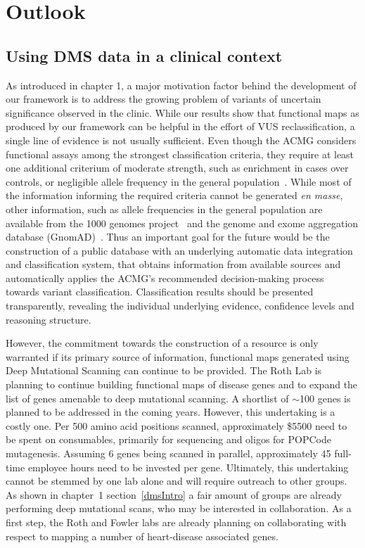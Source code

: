 \section{Outlook}

\subsection{Using DMS data in a clinical context}
As introduced in chapter 1, a major motivation factor behind the development of our framework is to address the growing problem of variants of uncertain significance observed in the clinic. While our results show that functional maps as produced by our framework can be helpful in the effort of VUS reclassification, a single line of evidence is not usually sufficient. Even though the ACMG considers functional assays among the strongest classification criteria, they require at least one additional criterium of moderate strength, such as enrichment in cases over controls, or negligible allele frequency in the general population~\cite{richards_standards_2015}. While most of the information informing the required criteria cannot be generated \textit{en masse}, other information, such as allele frequencies in the general population are available from the 1000 genomes project~\cite{the_1000_genomes_project_consortium_global_2015} and the genome and exome aggregation database (GnomAD)~\cite{lek_analysis_2016}. Thus an important goal for the future would be the construction of a public database with an underlying automatic data integration and classification system, that obtains information from available sources and automatically applies the ACMG's recommended decision-making process towards variant classification. Classification results should be presented transparently, revealing the individual underlying evidence, confidence levels and reasoning structure. 

However, the commitment towards the construction of a resource is only warranted if its primary source of information, functional maps generated using Deep Mutational Scanning can continue to be provided. The Roth Lab is planning to continue building functional maps of disease genes and to expand the list of genes amenable to deep mutational scanning. A shortlist of $\sim$100 genes is planned to be addressed in the coming years. However, this undertaking is a costly one. Per 500 amino acid positions scanned, approximately \$5500 need to be spent on consumables, primarily for sequencing and oligos for POPCode mutagenesis. Assuming 6 genes being scanned in parallel, approximately 45 full-time employee hours need to be invested per gene. Ultimately, this undertaking cannot be stemmed by one lab alone and will require outreach to other groups. As shown in chapter~1 section~\ref{dmsIntro} a fair amount of groups are already performing deep mutational scans, who may be interested in collaboration. As a first step, the Roth and Fowler labs are already planning on collaborating with respect to mapping a number of heart-disease associated genes.

